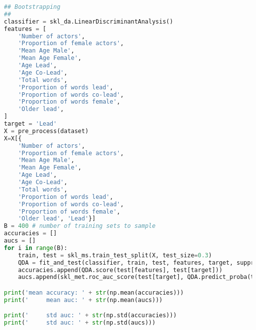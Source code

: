 \documentclass[../../project.tex]{subfiles}
\begin{document}
\begin{lstlisting}[language=Python]
## Bootstrapping
##
classifier = skl_da.LinearDiscriminantAnalysis()
features = [
    'Number of actors',
    'Proportion of female actors',
    'Mean Age Male',
    'Mean Age Female',
    'Age Lead',
    'Age Co-Lead',
    'Total words',
    'Proportion of words lead',
    'Proportion of words co-lead',
    'Proportion of words female',
    'Older lead',
]
target = 'Lead'
X = pre_process(dataset)
X=X[{
    'Number of actors',
    'Proportion of female actors',
    'Mean Age Male',
    'Mean Age Female',
    'Age Lead',
    'Age Co-Lead',
    'Total words',
    'Proportion of words lead',
    'Proportion of words co-lead',
    'Proportion of words female',
    'Older lead', 'Lead'}]
B = 400 # number of training sets to sample
accuracies = []
aucs = []
for i in range(B):
    train, test = skl_ms.train_test_split(X, test_size=0.3)
    QDA = fit_and_test(classifier, train, test, features, target, suppress_output=True)
    accuracies.append(QDA.score(test[features], test[target]))
    aucs.append(skl_met.roc_auc_score(test[target], QDA.predict_proba(test[features])[:,1]))

print('mean accuracy: ' + str(np.mean(accuracies)))
print('     mean auc: ' + str(np.mean(aucs)))

print('     std auc: ' + str(np.std(accuracies)))
print('     std auc: ' + str(np.std(aucs)))
	
		\end{lstlisting}
\end{document}
